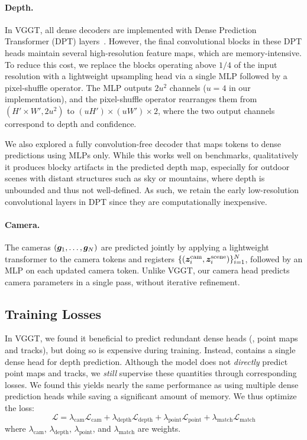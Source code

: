 \paragraph{Depth.}

In VGGT, all dense decoders are implemented with Dense Prediction Transformer (DPT) layers~\cite{ranftl21vision}.
However, the final convolutional blocks in these DPT heads maintain several high-resolution feature maps, which are memory-intensive.
To reduce this cost, we replace the blocks operating above $1/4$ of the input resolution with a lightweight upsampling head via a single MLP followed by a pixel-shuffle operator.
The MLP outputs $2u^{2}$ channels ($u=4$ in our implementation), and the pixel-shuffle operator rearranges them from $(H' \times W', 2u^{2})$ to $(uH') \times (uW') \times 2$, where the two output channels correspond to depth and confidence.

We also explored a fully convolution-free decoder that maps tokens to dense predictions using MLPs only.
While this works well on benchmarks, qualitatively it produces blocky artifacts in the predicted depth map, especially for outdoor scenes with distant structures such as sky or mountains, where depth is unbounded and thus not well-defined.
As such, we retain the early low-resolution convolutional layers in DPT since they are computationally inexpensive.

\paragraph{Camera.}

The cameras $(\boldsymbol{g}_1,\dots,\boldsymbol{g}_N)$ are predicted jointly by applying a lightweight transformer to the camera tokens and registers $\{(\boldsymbol{z}^{\text{cam}}_i,\boldsymbol{z}^{\text{scene}}_i)\}_{i=1}^N$, followed by an MLP on each updated camera token.
Unlike VGGT, our camera head predicts camera parameters in a single pass, without iterative refinement.

\subsection{Training Losses}%
\label{sec:training-losses}

In VGGT, we found it beneficial to predict redundant dense heads (\eg, point maps and tracks), but doing so is expensive during training.
Instead, \method contains a single dense head for depth prediction.
Although the model does not \emph{directly} predict point maps and tracks, we \emph{still} supervise these quantities through corresponding losses.
We found this yields nearly the same performance as using multiple dense prediction heads while saving a significant amount of memory.
We thus optimize the loss:
{\small
\begin{equation}
\label{eq:training-loss}
\mathcal{L} =
\lambda_{\text{cam}}   \mathcal{L}_{\text{cam}} +
\lambda_{\text{depth}} \mathcal{L}_{\text{depth}} +
\lambda_{\text{point}} \mathcal{L}_{\text{point}} +
\lambda_{\text{match}} \mathcal{L}_{\text{match}}
\end{equation}}%
where $\lambda_{\text{cam}}$, $\lambda_{\text{depth}}$, $\lambda_{\text{point}}$, and $\lambda_{\text{match}}$ are weights.

